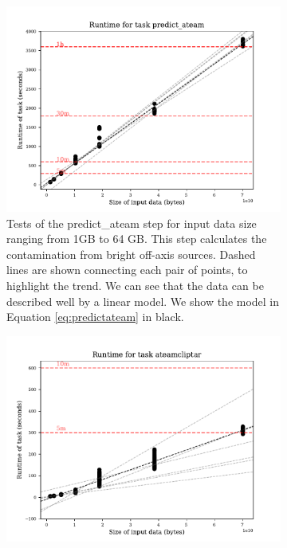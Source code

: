 \begin{figure}[t!]
        \centering
        \begin{subfigure}[b]{0.44\textwidth}
            \centering
            \includegraphics[width=\textwidth]{figures/predict_ateam_size.pdf}
            \caption[]%
            {{\small Tests of the  {\selectfont predict\_ateam} step for input data size ranging from 1GB to 64 GB. This step calculates the contamination from bright off-axis sources. Dashed lines are shown connecting each pair of points, to highlight the trend. We can see that the data can be described well by a linear model. We show the model in Equation \ref{eq:predictateam} in black.}}   
            \label{fig:predict_ateam}
        \end{subfigure}
        \hfill
        \begin{subfigure}[b]{0.44\textwidth}  
            \centering 
            \includegraphics[width=\textwidth]{figures/ateamcliptar_size.pdf}

\end{subfigure}
\end{figure}
